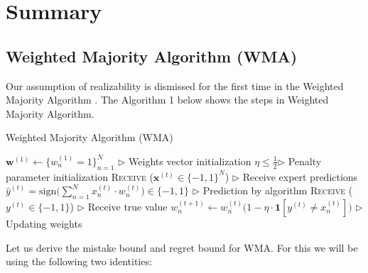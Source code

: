 \documentclass[11pt]{article}
\begin{document}
\section{Summary}
\subsection{Weighted Majority Algorithm (WMA)}
\normalfont
Our assumption of realizability is dismissed for the first time in the Weighted Majority Algorithm \cite{LITTLESTONE1994212}. The Algorithm 1 below shows the steps in Weighted Majority Algorithm.  

\begin{algorithm}[H]
\caption{Weighted Majority Algorithm (WMA)}
\label{algo:wma}
\begin{algorithmic}[1]
\STATE $\textbf{w}^{(1)} \leftarrow \{w_n^{(1)}=1\}_{n=1}^N$ \hfill $\triangleright$ Weights vector initialization
\STATE $\eta\leq\frac{1}{2}$\hfill $\triangleright$ Penalty parameter initialization
\STATE \textsc{Receive} ($\textbf{x}^{(t)}\in\{-1, 1\}^N$) \hfill $\triangleright$ Receive expert predictions
\STATE $\hat{y}^{(t)} = \text{sign}\Big(\sum_{n=1}^Nx_n^{(t)}\cdot w_n^{(t)}\Big)\in\{-1, 1\}$ \hfill $\triangleright$ Prediction by algorithm
\STATE \textsc{Receive} ($y^{(t)}\in\{-1, 1\}$) \hfill $\triangleright$ Receive true value
\STATE $w_n^{(t+1)}\leftarrow w_n^{(t)}\big(1-\eta\cdot\textbf{1}[y^{(t)}\neq x_n^{(t)}]\big)$ \hfill $\triangleright$ Updating weights
\ENDFOR
\end{algorithmic}
\end{algorithm}

Let us derive the mistake bound and regret bound for WMA. For this we will be using the following two identities:

\label{lemma:1}
\end{document}
